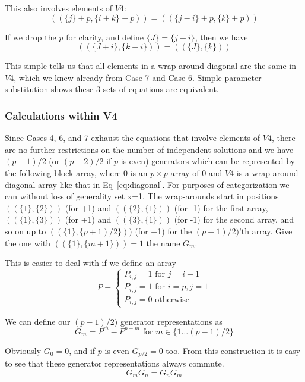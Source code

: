 \documentclass{revtex4-1}
\begin{document}
This also involves elements of $V4$:
$$(( \{j\} +p, \{i+k\}+p )) = (( \{j-i\}+p, \{k\}+p))$$

If we drop the $p$ for clarity, and define $\{J\} = \{j-i\}$, then we have
$$(( \{J+i\}, \{k+i\} )) = (( \{J\}, \{k\} ))$$

This simple tells us that all elements in a wrap-around diagonal are the same
in $V4$, which we knew already from Case 7 and Case 6.  Simple parameter
substitution shows these 3 sets of equations are equivalent.

\subsubsection{Calculations within V4}

Since Cases 4, 6, and 7 exhaust the equations that involve elements of $V4$, there are
no further restrictions on the number of independent solutions and we have
$(p-1)/2$ (or $(p-2)/2$ if $p$ is even) generators which can be represented by the following block array,
where $0$ is an $p\times p$ array of $0$ and $V4$ is a wrap-around diagonal
array like that in Eq~\ref{eq:diagonal}.  For purposes of categorization we can without
loss of generality set x=1.  The wrap-arounds start in positions
$((\{1\},\{2\}))$ (for +1) and $((\{2\},\{1\}))$ (for -1) for the first array, $((\{1\},\{3\}))$ (for +1) 
and $((\{3\},\{1\}))$ (for -1) for the second array, and
so on up to $((\{1\},\{p+1)/2\}))$ (for +1) for the $(p-1)/2)$'th array.  
Give the one with  $((\{1\},\{m+1\}))=1$ the name $G_m$.

This is easier to deal with if we define an array
\begin{equation}
P=
\begin{cases}
P_{i,j} = 1  \text{ for } j=i+1 \\
P_{i,j} = 1  \text{ for } i=p,j=1 \\
P_{i,j} = 0  \text{ otherwise}
\end{cases}
\end{equation}

We can define our $(p-1)/2)$ generator representations as
\begin{equation}
G_m = P^m - P^{p-m} \text{ for } m \in \{1 \dots (p-1)/2\}
\end{equation}

Obviously $G_0 = 0$, and if $p$ is even $G_{p/2}=0$ too.  From this construction it is easy to see that these generator representations always commute.
\begin{equation}
G_m G_n = G_n G_m
\end{equation}
\end{document}
